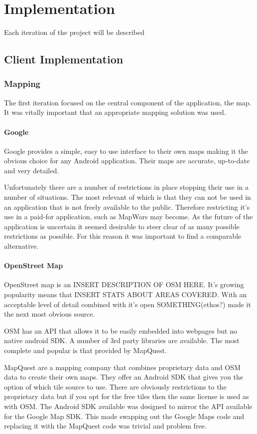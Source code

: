 \chapter{Implementation}


Each iteration of the project will be described




\section{Client Implementation}
\subsection{Mapping}
The first iteration focused on the central component of the application, the map. It was vitally important that an appropriate mapping solution was used.

\subsubsection{Google}
Google provides a simple, easy to use interface to their own maps making it the obvious choice for any Android application. Their maps are accurate, up-to-date and very detailed.

Unfortunately there are a number of restrictions in place stopping their use in a number of situations. The most relevant of which is that they can not be used in an application that is not freely available to the public. Therefore restricting it's use in a paid-for application, such as MapWars may become. As the future of the application is uncertain it seemed desirable to steer clear of as many possible restrictions as possible. For this reason it was important to find a comparable alternative.

\subsubsection{OpenStreet Map}
OpenStreet map is an INSERT DESCRIPTION OF OSM HERE. It's growing popularity means that INSERT STATS ABOUT AREAS COVERED. With an acceptable level of detail combined with it's open SOMETHING(ethos?) made it the next most obvious source.

OSM has an API that allows it to be easily embedded into webpages but no native android SDK. A number of 3rd party libraries are available. The most complete and popular is that provided by MapQuest.

MapQuest are a mapping company that combines proprietary data and OSM data to create their own maps. They offer an Android SDK that gives you the option of which tile source to use. There are obviously restrictions to the proprietary data but if you opt for the free tiles then the same license is used as with OSM. The Android SDK available was designed to mirror the API available for the Google Map SDK. This made swapping out the Google Maps code and replacing it with the MapQuest code was trivial and problem free.

